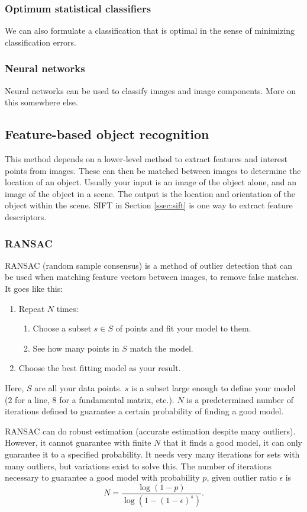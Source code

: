 \subsubsection{Optimum statistical classifiers}
We can also formulate a classification that is optimal in the sense of minimizing classification errors.

\subsubsection{Neural networks}
Neural networks can be used to classify images and image components. More on this somewhere else.

\subsection{Feature-based object recognition}
This method depends on a lower-level method to extract features and interest points from images. These can then be matched between images to determine the location of an object. Usually your input is an image of the object alone, and an image of the object in a scene. The output is the location and orientation of the object within the scene. SIFT in Section \ref{ssec:sift} is one way to extract feature descriptors.

\subsubsection{RANSAC}
RANSAC (random sample consensus) is a method of outlier detection that can be used when matching feature vectors between images, to remove false matches. It goes like this:
\begin{enumerate}
    \item Repeat $N$ times:
    \begin{enumerate}
        \item Choose a subset $s \in S$ of points and fit your model to them.
        \item See how many points in $S$ match the model.
    \end{enumerate}
    \item Choose the best fitting model as your result.
\end{enumerate}
Here, $S$ are all your data points. $s$ is a subset large enough to define your model (2 for a line, 8 for a fundamental matrix, etc.). $N$ is a predetermined number of iterations defined to guarantee a certain probability of finding a good model.

RANSAC can do robust estimation (accurate estimation despite many outliers). However, it cannot guarantee with finite $N$ that it finds a good model, it can only guarantee it to a specified probability. It needs very many iterations for sets with many outliers, but variations exist to solve this. The number of iterations necessary to guarantee a good model with probability $p$, given outlier ratio $\epsilon$ is
\begin{equation}
    N = \frac{\log(1-p)}{\log(1-(1-\epsilon)^s)}.
\end{equation}
